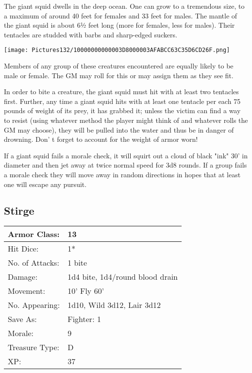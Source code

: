 \documentclass[a4paper,twoside,openany,10pt]{book}
\begin{document}
\begin{multicols}{2}
The
giant squid dwells in the deep ocean. One can grow to a tremendous size, to a maximum of around 40 feet for females and 33 feet for males. The mantle of the giant squid is about 6½ feet long (more for females, less for males). Their tentacles are studded with barbs and sharp-edged suckers.


\begin{center} \texttt{[image: Pictures132/10000000000003D8000003AFABCC63C35D6CD26F.png]} \end{center}

Members of any group of these creatures encountered are equally likely to be male or female. The GM may roll for this or may assign them as they see fit.

In order to bite a creature, the giant squid must hit with at least two tentacles first. Further, any time a giant squid hits with at least one tentacle per each 75 pounds of weight of its prey, it has grabbed it; unless the victim can find a way to resist (using whatever method the player might think of and whatever rolls the GM may choose), they will be pulled into the water and thus be in danger of drowning. Don' t forget to account for the weight of armor worn!

If a giant squid fails a morale check, it will squirt out a cloud of black "ink" 30' in diameter and then jet away at twice normal speed for 3d8 rounds. If a group fails a morale check they will move away in random directions in hopes that at least one will escape any pursuit.

\subsection*{Stirge}\label{stirge}

\begin{tabularx}{0.50\textwidth}{@{}lX@{}}
Armor Class: & 13 \\\hline
Hit Dice: & 1* \\\hline
No. of Attacks: & 1 bite \\\hline
Damage: & 1d4 bite, 1d4/round blood drain \\\hline
Movement: & 10' Fly 60' \\\hline
No. Appearing: & 1d10, Wild 3d12, Lair 3d12 \\\hline
Save As: & Fighter: 1 \\\hline
Morale: & 9 \\\hline
Treasure Type: & D \\\hline
XP: & 37 \\\hline
\end{tabularx}\medskip


\end{multicols}
\end{document}
